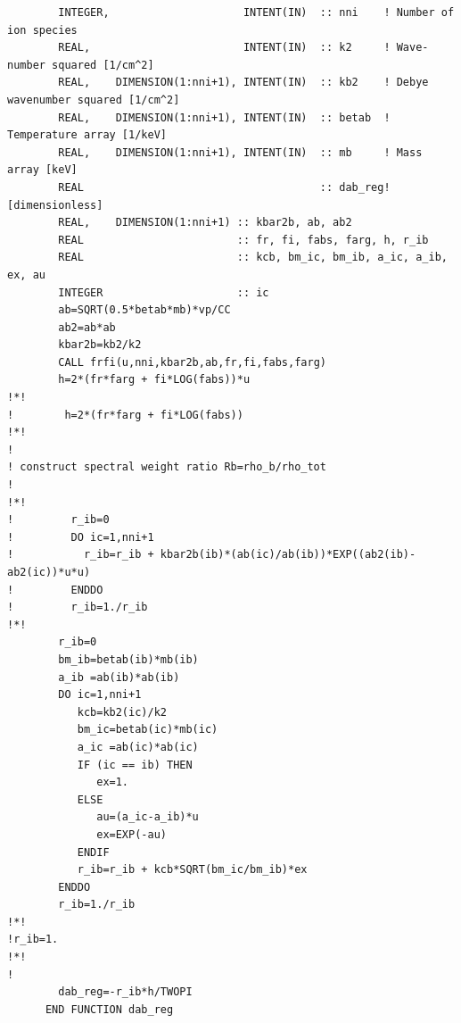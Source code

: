 \documentclass[preprint,12pt,eqsecnum,nofootinbib,amsmath,amssymb]{revtex4}
\begin{document}
{\begin{verbatim}
        INTEGER,                     INTENT(IN)  :: nni    ! Number of ion species
        REAL,                        INTENT(IN)  :: k2     ! Wave-number squared [1/cm^2]
        REAL,    DIMENSION(1:nni+1), INTENT(IN)  :: kb2    ! Debye wavenumber squared [1/cm^2]
        REAL,    DIMENSION(1:nni+1), INTENT(IN)  :: betab  ! Temperature array [1/keV]
        REAL,    DIMENSION(1:nni+1), INTENT(IN)  :: mb     ! Mass array [keV]
        REAL                                     :: dab_reg! [dimensionless]
        REAL,    DIMENSION(1:nni+1) :: kbar2b, ab, ab2
        REAL                        :: fr, fi, fabs, farg, h, r_ib
        REAL                        :: kcb, bm_ic, bm_ib, a_ic, a_ib, ex, au
        INTEGER                     :: ic
        ab=SQRT(0.5*betab*mb)*vp/CC
        ab2=ab*ab
        kbar2b=kb2/k2
        CALL frfi(u,nni,kbar2b,ab,fr,fi,fabs,farg)
        h=2*(fr*farg + fi*LOG(fabs))*u
!*!
!        h=2*(fr*farg + fi*LOG(fabs))
!*!
!
! construct spectral weight ratio Rb=rho_b/rho_tot
!
!*!
!         r_ib=0
!         DO ic=1,nni+1
!           r_ib=r_ib + kbar2b(ib)*(ab(ic)/ab(ib))*EXP((ab2(ib)-ab2(ic))*u*u)
!         ENDDO
!         r_ib=1./r_ib
!*!
        r_ib=0
        bm_ib=betab(ib)*mb(ib)
        a_ib =ab(ib)*ab(ib)
        DO ic=1,nni+1
           kcb=kb2(ic)/k2
           bm_ic=betab(ic)*mb(ic)
           a_ic =ab(ic)*ab(ic)
           IF (ic == ib) THEN
              ex=1.
           ELSE
              au=(a_ic-a_ib)*u
              ex=EXP(-au)
           ENDIF
           r_ib=r_ib + kcb*SQRT(bm_ic/bm_ib)*ex
        ENDDO      
        r_ib=1./r_ib
!*!
!r_ib=1.
!*!
!
        dab_reg=-r_ib*h/TWOPI
      END FUNCTION dab_reg


\end{verbatim}}
\end{document}
